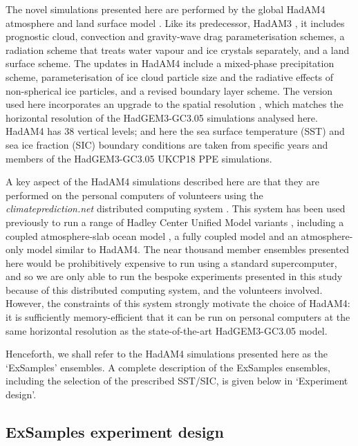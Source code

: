       The novel simulations presented here are performed by the global HadAM4 atmosphere and land surface model \citep{webb_combining_2001,williams_evaluating_2003}. Like its predecessor, HadAM3 \citep{pope_impact_2000}, it includes prognostic cloud, convection and gravity-wave drag parameterisation schemes, a radiation scheme that treats water vapour and ice crystals separately, and a land surface scheme. The updates in HadAM4 include a mixed-phase precipitation scheme, parameterisation of ice cloud particle size and the radiative effects of non-spherical ice particles, and a revised boundary layer scheme. The version used here incorporates an upgrade to the spatial resolution \citep{bevacqua_larger_2021,watson_multi-thousand_2020}, which matches the horizontal resolution of the HadGEM3-GC3.05 simulations analysed here. HadAM4 has 38 vertical levels; and here the sea surface temperature (SST) and sea ice fraction (SIC) boundary conditions are taken from specific years and members of the HadGEM3-GC3.05 UKCP18 PPE simulations.

      A key aspect of the HadAM4 simulations described here are that they are performed on the personal computers of volunteers using the \emph{climateprediction.net} distributed computing system \citep{allen_-it-yourself_1999,anderson_boinc_2004,stainforth_distributed_2002}. This system has been used previously to run a range of Hadley Center Unified Model variants \citep{brown_unified_2012}, including a coupled atmosphere-slab ocean model \citep{stainforth_uncertainty_2005}, a fully coupled model \citep{frame_climatepredictionnet_2009} and an atmosphere-only model \citep{pall_anthropogenic_2011} similar to HadAM4. The near thousand member ensembles presented here would be prohibitively expensive to run using a standard supercomputer, and so we are only able to run the bespoke experiments presented in this study because of this distributed computing system, and the volunteers involved. However, the constraints of this system strongly motivate the choice of HadAM4: it is sufficiently memory-efficient that it can be run on personal computers at the same horizontal resolution as the state-of-the-art HadGEM3-GC3.05 model.

      Henceforth, we shall refer to the HadAM4 simulations presented here as the `ExSamples' ensembles. A complete description of the ExSamples ensembles, including the selection of the prescribed SST/SIC, is given below in `Experiment design'.
  
  \subsection{ExSamples experiment design}

